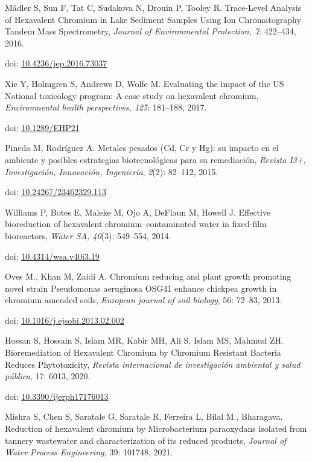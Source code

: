 \begin{thebibliography}{99}
 Mädler S, Sun F, Tat C, Sudakova N, Drouin P, Tooley R.
Trace-Level Analysis of Hexavalent Chromium in Lake Sediment Samples
Using Ion Chromatography Tandem Mass Spectrometry, \emph{Journal of
Environmental Protection, 7}: 422--434, 2016.

doi: \href{https://doi.org/10.4236/jep.2016.73037}{10.4236/jep.2016.73037}

 Xie Y, Holmgren S, Andrews D, Wolfe M. Evaluating the impact of
the US National toxicology program: A case study on hexavalent chromium,
\emph{Environmental health perspectives, 125}: 181--188, 2017.

doi: \href{http://dx.doi.org/10.1289/EHP21}{10.1289/EHP21}

 Pineda M, Rodríguez A. Metales pesados (Cd, Cr y Hg): su impacto
en el ambiente y posibles estrategias biotecnológicas para su
remediación, \emph{Revista I3+, Investigación, Innovación, Ingeniería},
\emph{2}(2): 82--112, 2015.

doi: \href{https://doi.org/10.24267/23462329.113}{10.24267/23462329.113}

 Williams P, Botes E, Maleke M, Ojo A, DeFlaun M, Howell J.
Effective bioreduction of hexavalent chromium--contaminated water in
fixed-film bioreactors, \emph{Water SA, 40}(3): 549--554, 2014.

doi: \href{http://dx.doi.org/10.4314/wsa.v40i3.19}{10.4314/wsa.v40i3.19}

 Oves M., Khan M, Zaidi A. Chromium reducing and plant growth
promoting novel strain Pseudomonas aeruginosa OSG41 enhance chickpea
growth in chromium amended soils, \emph{European journal of soil
biology}, 56: 72--83, 2013.

doi: \href{https://doi.org/10.1016/j.ejsobi.2013.02.002}{10.1016/j.ejsobi.2013.02.002}

 Hossan S, Hossain S, Islam MR, Kabir MH, Ali S, Islam MS, Mahmud
ZH. Bioremediation of Hexavalent Chromium by Chromium Resistant Bacteria
Reduces Phytotoxicity, \emph{Revista internacional de investigación
ambiental y salud pública}, 17: 6013, 2020.

doi: \href{https://doi.org/10.3390/ijerph17176013}{10.3390/ijerph17176013}

 Mishra S, Chen S, Saratale G, Saratale R, Ferreira L, Bilal M.,
Bharagava. Reduction of hexavalent chromium by Microbacterium
paraoxydans isolated from tannery wastewater and characterization of its
reduced products, \emph{Journal of Water Process Engineering,} 39:
101748, 2021.


\end{thebibliography}
